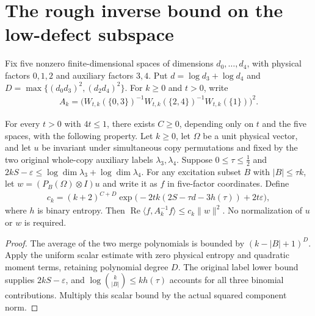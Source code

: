 \section{The rough inverse bound on the low-defect subspace}

Fix five nonzero finite-dimensional spaces of dimensions $d_0,\ldots,d_4$,
with physical factors $0,1,2$ and auxiliary factors $3,4$. Put
$d=\log d_3+\log d_4$ and
$D=\max\{(d_0d_3)^2,(d_2d_4)^2\}$.
For $k\geq0$ and $t>0$, write
\begin{align}
 A_k=\bigl(W_{t,k}(\{0,3\})^{-1}W_{t,k}(\{2,4\})^{-1}
   W_{t,k}(\{1\})\bigr)^2.
\end{align}

\begin{theorem}
  \label{thm:actual_component_inverse_rough_uniform}
  For every $t>0$ with $4t\leq1$, there exists $C\geq0$, depending
  only on $t$ and the five spaces, with the following property.
  Let $k\geq0$, let $\Omega$ be a unit physical vector, and let $u$ be
  invariant under simultaneous copy permutations and fixed by the two
  original whole-copy auxiliary labels $\lambda_3,\lambda_4$.
  Suppose $0\leq\tau\leq\tfrac12$ and
  $2kS-\varepsilon\leq\log\dim\lambda_3+\log\dim\lambda_4$.
  For any excitation subset $B$ with $|B|\leq\tau k$, let
  $w=(P_B(\Omega)\otimes I)u$ and write it as $f$ in five-factor coordinates.
  Define
  \begin{align}
    c_k=(k+2)^{C+D}
      \exp\bigl(-2tk(2S-\tau d-3h(\tau))+2t\varepsilon\bigr),
    \label{eq:rough_uniform_rate}
  \end{align}
  where $h$ is binary entropy. Then
  $\operatorname{Re}\langle f,A_k^{-1}f\rangle\leq c_k\|w\|^2$.
  No normalization of $u$ or $w$ is required.
\end{theorem}
\begin{proof}
  The average of the two merge polynomials is bounded by
  $(k-|B|+1)^D$. Apply the uniform scalar estimate with zero physical
  entropy and quadratic moment terms, retaining polynomial degree $D$.
  The original label lower bound supplies $2kS-\varepsilon$, and
  $\log\binom{k}{|B|}\leq kh(\tau)$ accounts for all three binomial
  contributions. Multiply this scalar bound by the actual squared
  component norm.
\end{proof}

